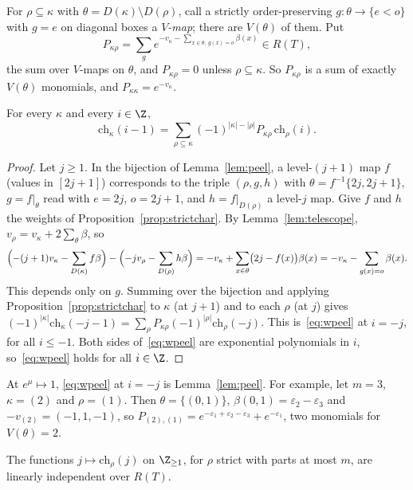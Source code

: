 For $\rho\subseteq\kappa$ with $\theta=D(\kappa)\setminus D(\rho)$, call a strictly order-preserving
$g\colon\theta\to\{e<o\}$ with $g=e$ on diagonal boxes a \emph{$V$-map}; there are $V(\theta)$ of
them. Put
\[ P_{\kappa\rho}=\sum_{g}e^{-v_\kappa-\sum_{x\in\theta,\ g(x)=o}\beta(x)}\in R(T), \]
the sum over $V$-maps on $\theta$, and $P_{\kappa\rho}=0$ unless $\rho\subseteq\kappa$. So
$P_{\kappa\rho}$ is a sum of exactly $V(\theta)$ monomials, and $P_{\kappa\kappa}=e^{-v_\kappa}$.

\begin{proposition}\label{prop:wpeel}
For every $\kappa$ and every $i\in\Z$,
\begin{equation}\label{eq:wpeel}
\mathrm{ch}_\kappa(i-1)=\sum_{\rho\subseteq\kappa}(-1)^{|\kappa|-|\rho|}P_{\kappa\rho}\,\mathrm{ch}_\rho(i).
\end{equation}
\end{proposition}

\begin{proof}
Let $j\ge1$. In the bijection of Lemma~\ref{lem:peel}, a level-$(j+1)$ map $f$ (values in
$[2j+1]$) corresponds to the triple $(\rho,g,h)$ with $\theta=f^{-1}\{2j,2j+1\}$, $g=f|_\theta$ read
with $e=2j$, $o=2j+1$, and $h=f|_{D(\rho)}$ a level-$j$ map. Give $f$ and $h$ the weights of
Proposition~\ref{prop:strictchar}. By Lemma~\ref{lem:telescope}, $v_\rho=v_\kappa+2\sum_\theta\beta$, so
\[ \Bigl(-(j+1)v_\kappa-\sum_{D(\kappa)}f\beta\Bigr)-\Bigl(-jv_\rho-\sum_{D(\rho)}h\beta\Bigr)
=-v_\kappa+\sum_{x\in\theta}\bigl(2j-f(x)\bigr)\beta(x)=-v_\kappa-\sum_{g(x)=o}\beta(x). \]
This depends only on $g$. Summing over the bijection and applying
Proposition~\ref{prop:strictchar} to $\kappa$ (at $j+1$) and to each $\rho$ (at $j$) gives
$(-1)^{|\kappa|}\mathrm{ch}_\kappa(-j-1)=\sum_\rho P_{\kappa\rho}(-1)^{|\rho|}\mathrm{ch}_\rho(-j)$.
This is~\eqref{eq:wpeel} at $i=-j$, for all $i\le-1$. Both sides of~\eqref{eq:wpeel} are
exponential polynomials in $i$, so~\eqref{eq:wpeel} holds for all $i\in\Z$.
\end{proof}

At $e^\mu\mapsto1$, \eqref{eq:wpeel} at $i=-j$ is Lemma~\ref{lem:peel}. For example, let $m=3$,
$\kappa=(2)$ and $\rho=(1)$. Then $\theta=\{(0,1)\}$, $\beta(0,1)=\varepsilon_2-\varepsilon_3$ and
$-v_{(2)}=(-1,1,-1)$, so $P_{(2),(1)}=e^{-\varepsilon_1+\varepsilon_2-\varepsilon_3}+e^{-\varepsilon_1}$, two
monomials for $V(\theta)=2$.

\begin{lemma}[Independence]\label{lem:indep}
The functions $j\mapsto\mathrm{ch}_\rho(j)$ on $\Z_{\ge1}$, for $\rho$ strict with parts at most $m$, are
linearly independent over $R(T)$.
\end{lemma}

